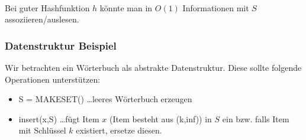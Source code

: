 \paragraph*{} Bei guter Hashfunktion $h$ könnte man in $O(1)$ Informationen mit $S$ assoziieren/auslesen.

\subsubsection{Datenstruktur Beispiel}
Wir betrachten ein Wörterbuch als abstrakte Datenstruktur. Diese sollte folgende Operationen unterstützen:
\begin{itemize}
	\item[] S = MAKESET() \dots leeres Wörterbuch erzeugen
	\item[] insert(x,S) \dots fügt Item $x$ (Item besteht aus (k,inf)) in $S$ ein bzw. falls Item mit Schlüssel $k$ existiert, ersetze diesen.
\end{itemize}














